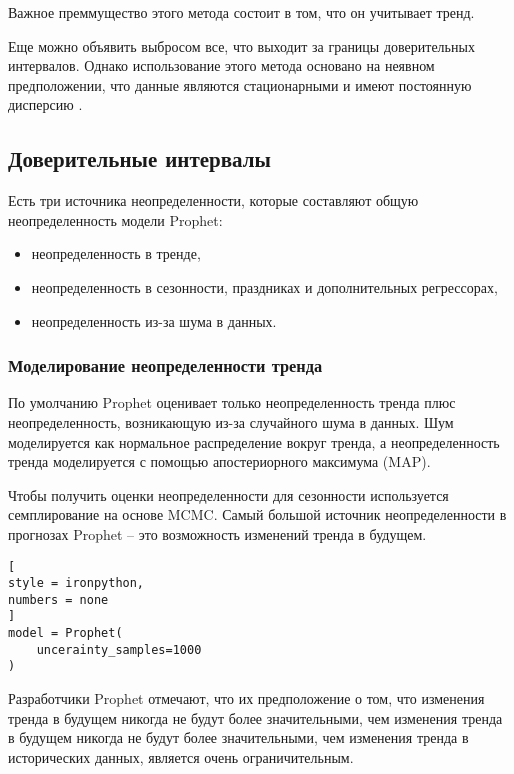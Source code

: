 \documentclass[%
	11pt,
	a4paper,
	utf8,
		]{article}
\begin{document}
Важное преммущество этого метода состоит в том, что он учитывает тренд.

Еще можно объявить выбросом все, что выходит за границы доверительных интервалов. Однако использование этого метода основано на неявном предположении, что данные являются стационарными и имеют постоянную дисперсию \cite[]{gruzdev:time-series-2022}. 

\subsection{Доверительные интервалы}

Есть три источника неопределенности, которые составляют общую неопределенность модели Prophet:
\begin{itemize}
	\item неопределенность в тренде,
	
	\item неопределенность в сезонности, праздниках и дополнительных регрессорах,
	
	\item неопределенность из-за шума в данных.
\end{itemize}

\subsubsection{Моделирование неопределенности тренда}

По умолчанию Prophet оценивает только неопределенность тренда плюс неопределенность, возникающую из-за случайного шума в данных. Шум моделируется как нормальное распределение вокруг тренда, а неопределенность тренда моделируется с помощью апостериорного максимума (MAP).

Чтобы получить оценки неопределенности для сезонности используется семплирование на основе MCMC. Самый большой источник неопределенности в прогнозах Prophet -- это возможность изменений тренда в будущем.
\begin{lstlisting}[
style = ironpython,
numbers = none
]
model = Prophet(
    uncerainty_samples=1000
)
\end{lstlisting}

Разработчики Prophet отмечают, что их предположение о том, что изменения тренда в будущем никогда не будут более значительными, чем изменения тренда в будущем никогда не будут более значительными, чем изменения тренда в исторических данных, является очень ограничительным.
\end{document}
